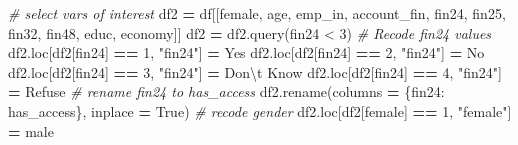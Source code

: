 \documentclass[water,article,submit,moreauthors,pdftex]{mdpi}
\newenvironment{Shaded}{\begin{snugshade}}{\end{snugshade}}
\newcommand{\CharTok}[1]{\textcolor[rgb]{0.31,0.60,0.02}{#1}}
\newcommand{\CommentTok}[1]{\textcolor[rgb]{0.56,0.35,0.01}{\textit{#1}}}
\newcommand{\DecValTok}[1]{\textcolor[rgb]{0.00,0.00,0.81}{#1}}
\newcommand{\NormalTok}[1]{#1}
\newcommand{\OperatorTok}[1]{\textcolor[rgb]{0.81,0.36,0.00}{\textbf{#1}}}
\newcommand{\StringTok}[1]{\textcolor[rgb]{0.31,0.60,0.02}{#1}}
\newcommand{\VariableTok}[1]{\textcolor[rgb]{0.00,0.00,0.00}{#1}}
\begin{document}
\begin{Shaded}
\begin{Highlighting}[]
\CommentTok{\# select vars of interest}
\NormalTok{df2 }\OperatorTok{=}\NormalTok{ df[[}\StringTok{\textquotesingle{}female\textquotesingle{}}\NormalTok{, }\StringTok{\textquotesingle{}age\textquotesingle{}}\NormalTok{, }\StringTok{\textquotesingle{}emp\_in\textquotesingle{}}\NormalTok{, }\StringTok{\textquotesingle{}account\_fin\textquotesingle{}}\NormalTok{, }\StringTok{\textquotesingle{}fin24\textquotesingle{}}\NormalTok{, }\StringTok{\textquotesingle{}fin25\textquotesingle{}}\NormalTok{, }\StringTok{\textquotesingle{}fin32\textquotesingle{}}\NormalTok{, }\StringTok{\textquotesingle{}fin48\textquotesingle{}}\NormalTok{, }\StringTok{\textquotesingle{}educ\textquotesingle{}}\NormalTok{, }\StringTok{\textquotesingle{}economy\textquotesingle{}}\NormalTok{]]}
\NormalTok{df2 }\OperatorTok{=}\NormalTok{ df2.query(}\StringTok{\textquotesingle{}fin24 \textless{} 3\textquotesingle{}}\NormalTok{)}
\CommentTok{\# Recode fin24 values}
\NormalTok{df2.loc[df2[}\StringTok{\textquotesingle{}fin24\textquotesingle{}}\NormalTok{] }\OperatorTok{==} \DecValTok{1}\NormalTok{, }\StringTok{"fin24"}\NormalTok{] }\OperatorTok{=} \StringTok{\textquotesingle{}Yes\textquotesingle{}}
\NormalTok{df2.loc[df2[}\StringTok{\textquotesingle{}fin24\textquotesingle{}}\NormalTok{] }\OperatorTok{==} \DecValTok{2}\NormalTok{, }\StringTok{"fin24"}\NormalTok{] }\OperatorTok{=} \StringTok{\textquotesingle{}No\textquotesingle{}}
\NormalTok{df2.loc[df2[}\StringTok{\textquotesingle{}fin24\textquotesingle{}}\NormalTok{] }\OperatorTok{==} \DecValTok{3}\NormalTok{, }\StringTok{"fin24"}\NormalTok{] }\OperatorTok{=} \StringTok{\textquotesingle{}Don}\CharTok{\textbackslash{}\textquotesingle{}}\StringTok{t Know\textquotesingle{}}
\NormalTok{df2.loc[df2[}\StringTok{\textquotesingle{}fin24\textquotesingle{}}\NormalTok{] }\OperatorTok{==} \DecValTok{4}\NormalTok{, }\StringTok{"fin24"}\NormalTok{] }\OperatorTok{=} \StringTok{\textquotesingle{}Refuse\textquotesingle{}}
\CommentTok{\# rename fin24 to has\_access}
\NormalTok{df2.rename(columns }\OperatorTok{=}\NormalTok{ \{}\StringTok{\textquotesingle{}fin24\textquotesingle{}}\NormalTok{: }\StringTok{\textquotesingle{}has\_access\textquotesingle{}}\NormalTok{\}, inplace }\OperatorTok{=} \VariableTok{True}\NormalTok{)}
\CommentTok{\# recode gender}
\NormalTok{df2.loc[df2[}\StringTok{\textquotesingle{}female\textquotesingle{}}\NormalTok{] }\OperatorTok{==} \DecValTok{1}\NormalTok{, }\StringTok{"female"}\NormalTok{] }\OperatorTok{=} \StringTok{\textquotesingle{}male\textquotesingle{}}

\end{Highlighting}
\end{Shaded}
\end{document}
